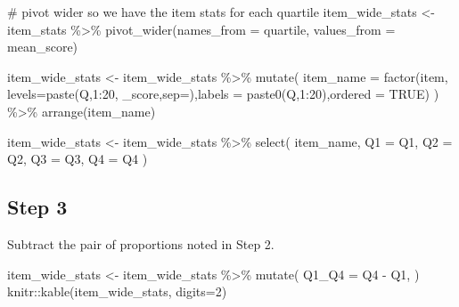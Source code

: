 \documentclass[
  letterpaper,
  DIV=11,
  numbers=noendperiod]{scrreprt}
\newenvironment{Shaded}{\begin{snugshade}}{\end{snugshade}}
\newcommand{\AttributeTok}[1]{\textcolor[rgb]{0.40,0.45,0.13}{#1}}
\newcommand{\CommentTok}[1]{\textcolor[rgb]{0.37,0.37,0.37}{#1}}
\newcommand{\ConstantTok}[1]{\textcolor[rgb]{0.56,0.35,0.01}{#1}}
\newcommand{\DecValTok}[1]{\textcolor[rgb]{0.68,0.00,0.00}{#1}}
\newcommand{\FunctionTok}[1]{\textcolor[rgb]{0.28,0.35,0.67}{#1}}
\newcommand{\NormalTok}[1]{\textcolor[rgb]{0.00,0.23,0.31}{#1}}
\newcommand{\OtherTok}[1]{\textcolor[rgb]{0.00,0.23,0.31}{#1}}
\newcommand{\SpecialCharTok}[1]{\textcolor[rgb]{0.37,0.37,0.37}{#1}}
\newcommand{\StringTok}[1]{\textcolor[rgb]{0.13,0.47,0.30}{#1}}
\begin{document}
\begin{Shaded}
\begin{Highlighting}[]
\CommentTok{\# pivot wider so we have the item stats for each quartile}
\NormalTok{item\_wide\_stats }\OtherTok{\textless{}{-}}\NormalTok{ item\_stats }\SpecialCharTok{\%\textgreater{}\%} 
  \FunctionTok{pivot\_wider}\NormalTok{(}\AttributeTok{names\_from =}\NormalTok{ quartile, }\AttributeTok{values\_from =}\NormalTok{ mean\_score)}

\NormalTok{item\_wide\_stats }\OtherTok{\textless{}{-}}\NormalTok{ item\_wide\_stats }\SpecialCharTok{\%\textgreater{}\%} \FunctionTok{mutate}\NormalTok{(}
    \AttributeTok{item\_name =} \FunctionTok{factor}\NormalTok{(item, }\AttributeTok{levels=}\FunctionTok{paste}\NormalTok{(}\StringTok{\textquotesingle{}Q\textquotesingle{}}\NormalTok{,}\DecValTok{1}\SpecialCharTok{:}\DecValTok{20}\NormalTok{, }\StringTok{\textquotesingle{}\_score\textquotesingle{}}\NormalTok{,}\AttributeTok{sep=}\StringTok{\textquotesingle{}\textquotesingle{}}\NormalTok{),}\AttributeTok{labels =} \FunctionTok{paste0}\NormalTok{(}\StringTok{\textquotesingle{}Q\textquotesingle{}}\NormalTok{,}\DecValTok{1}\SpecialCharTok{:}\DecValTok{20}\NormalTok{),}\AttributeTok{ordered =} \ConstantTok{TRUE}\NormalTok{)}
\NormalTok{    ) }\SpecialCharTok{\%\textgreater{}\%} \FunctionTok{arrange}\NormalTok{(item\_name) }

\NormalTok{item\_wide\_stats }\OtherTok{\textless{}{-}}\NormalTok{ item\_wide\_stats }\SpecialCharTok{\%\textgreater{}\%} \FunctionTok{select}\NormalTok{(}
\NormalTok{    item\_name, }
    \AttributeTok{Q1 =} \StringTok{\textasciigrave{}}\AttributeTok{Q1}\StringTok{\textasciigrave{}}\NormalTok{, }
    \AttributeTok{Q2 =} \StringTok{\textasciigrave{}}\AttributeTok{Q2}\StringTok{\textasciigrave{}}\NormalTok{, }
    \AttributeTok{Q3 =} \StringTok{\textasciigrave{}}\AttributeTok{Q3}\StringTok{\textasciigrave{}}\NormalTok{, }
    \AttributeTok{Q4 =} \StringTok{\textasciigrave{}}\AttributeTok{Q4}\StringTok{\textasciigrave{}}
\NormalTok{    )}
\end{Highlighting}
\end{Shaded}

\hypertarget{step-3}{%
\subsection{Step 3}\label{step-3}}

Subtract the pair of proportions noted in Step 2.

\begin{Shaded}
\begin{Highlighting}[]
\NormalTok{item\_wide\_stats }\OtherTok{\textless{}{-}}\NormalTok{ item\_wide\_stats }\SpecialCharTok{\%\textgreater{}\%} \FunctionTok{mutate}\NormalTok{(}
    \AttributeTok{Q1\_Q4 =}\NormalTok{ Q4 }\SpecialCharTok{{-}}\NormalTok{ Q1,}
\NormalTok{    )}
\NormalTok{knitr}\SpecialCharTok{::}\FunctionTok{kable}\NormalTok{(item\_wide\_stats, }\AttributeTok{digits=}\DecValTok{2}\NormalTok{)}
\end{Highlighting}
\end{Shaded}
\end{document}
